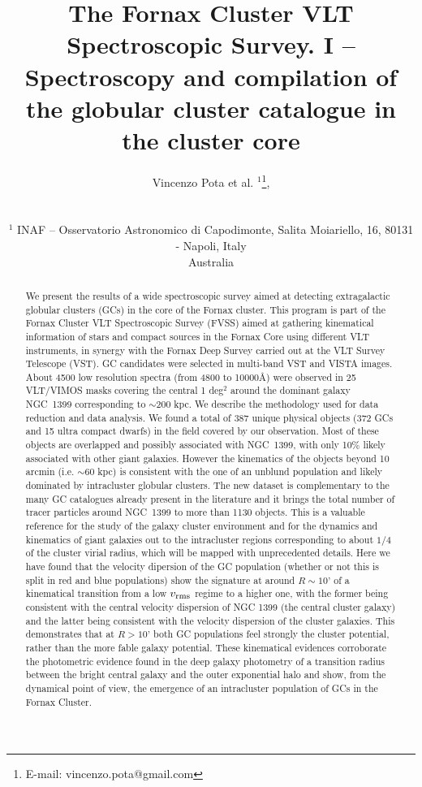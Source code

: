 \documentclass[useAMS,usenatbib]{mn2e}
\title[The Fornax Cluster VLT Spectroscopic Survey]{The Fornax Cluster VLT 
Spectroscopic Survey. I -- Spectroscopy and compilation of the globular cluster 
catalogue in the cluster core}
\author[Pota et al.]{\noindent
Vincenzo Pota et al. $^{1}$\thanks{E-mail: vincenzo.pota@gmail.com}, 

\\~\\
$^1$ INAF -- Osservatorio Astronomico di Capodimonte, Salita Moiariello, 16, 
80131 - Napoli, Italy\\
Australia\\
}
\begin{document}
\label{firstpage}

\maketitle
\begin{abstract}
We present the results of a wide spectroscopic survey aimed at detecting 
extragalactic globular clusters (GCs) in the core of the Fornax cluster. This 
program is part of the Fornax Cluster VLT Spectroscopic Survey (FVSS) aimed at 
gathering kinematical information of stars and compact sources in the Fornax 
Core using different VLT instruments, in synergy with the Fornax Deep Survey 
carried out at the VLT Survey Telescope (VST). GC candidates were selected in 
multi-band VST and VISTA images. About 4500 low resolution spectra (from 4800 
to 10000\AA) were observed in 25 VLT/VIMOS masks covering the central 1 deg$^2$ 
around the dominant galaxy NGC~1399 corresponding to $\sim$200 kpc. We describe 
the methodology used for data reduction and data analysis. We found a total of 
387 unique physical objects (372 GCs and 15 ultra compact dwarfs) in the field 
covered by our observation. Most of these objects are overlapped and possibly 
associated with NGC~1399, with only 10\% likely associated with other giant 
galaxies. However the kinematics of the objects beyond 10 arcmin (i.e. $\sim$60 
kpc) is consistent with the one of an unblund population and likely dominated 
by intracluster globular clusters. The new dataset is complementary to the many 
GC catalogues already present in the literature and it brings the total number 
of tracer particles around  NGC~1399 to more than 1130 objects. This is a 
valuable reference for the study of the galaxy cluster environment and for the 
dynamics and kinematics of giant galaxies out to the intracluster regions 
corresponding to about $1/4$ of the cluster virial radius, which will be mapped 
with unprecedented details. Here we have found that the velocity dipersion of 
the GC population (whether or not this is split in red and blue populations) 
show the signature at around $R\sim10’$ of a kinematical transition from a low 
$v_{\rm rms}$ regime to a higher one, with the former being consistent with the 
central velocity dispersion of NGC 1399 (the central cluster galaxy) and the 
latter being consistent with the velocity dispersion of the cluster galaxies. 
This demonstrates that at $R>10’$ both GC populations feel strongly the cluster 
potential, rather than the more fable galaxy potential. These kinematical 
evidences corroborate the photometric evidence found in the deep galaxy 
photometry of a transition radius between the bright central galaxy and the 
outer exponential halo and show, from the dynamical point of view, the 
emergence of an intracluster population of GCs in the Fornax Cluster.

\end{abstract}
\end{document}
